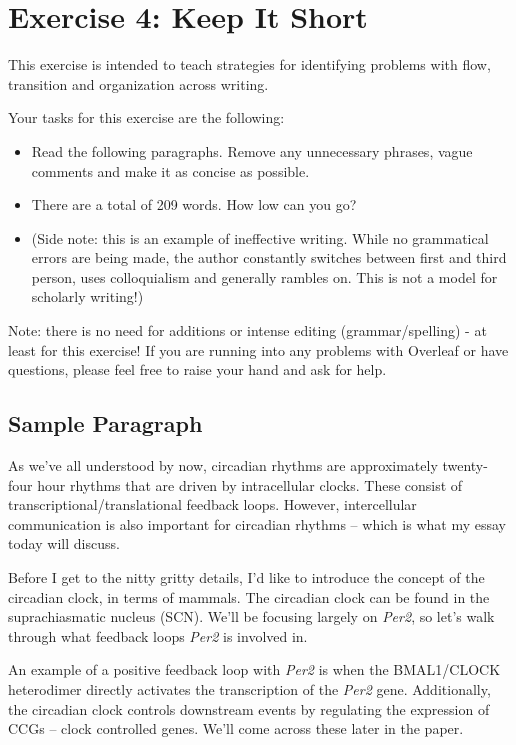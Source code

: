 \documentclass{article}
\begin{document}
\section{Exercise 4: Keep It Short}

This exercise is intended to teach strategies for identifying problems with flow, transition and organization across writing.

Your tasks for this exercise are the following:
\begin{itemize}
\item Read the following paragraphs. Remove any unnecessary phrases, vague comments and make it as concise as possible. 
\item There are a total of 209 words. How low can you go?
\item (Side note: this is an example of ineffective writing. While no grammatical errors are being made, the author constantly switches between first and third person, uses colloquialism and generally rambles on. This is not a model for scholarly writing!)
\end{itemize}

Note: there is no need for additions or intense editing (grammar/spelling) - at least for this exercise! If you are running into any problems with Overleaf or have questions, please feel free to raise your hand and ask for help.

\subsection*{Sample Paragraph}

As we’ve all understood by now, circadian rhythms are approximately twenty-four hour rhythms that are driven by intracellular clocks. These consist of transcriptional/translational feedback loops. However, intercellular communication is also important for circadian rhythms – which is what my essay today will discuss. 

Before I get to the nitty gritty details, I’d like to introduce the concept of the circadian clock, in terms of mammals. The circadian clock can be found in the suprachiasmatic nucleus (SCN). We'll be focusing largely on \textit{Per2}, so let’s walk through what feedback loops \textit{Per2} is involved in.

An example of a positive feedback loop with \textit{Per2} is when the BMAL1/CLOCK heterodimer directly activates the transcription of the \textit{Per2} gene. Additionally, the circadian clock controls downstream events by regulating the expression of CCGs – clock controlled genes. We’ll come across these later in the paper.
\end{document}
